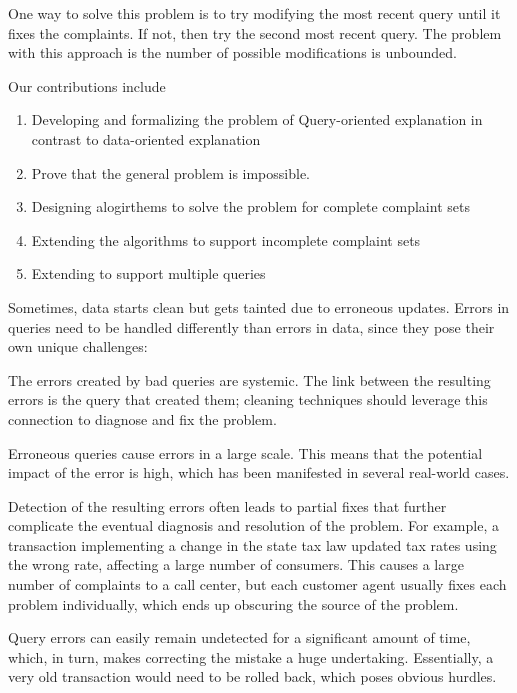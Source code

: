 One way to solve this problem is to try modifying the most recent query until it fixes the complaints.  
If not, then try the second most recent query.  
The problem with this approach is the number of possible modifications is unbounded.

Our contributions include

\begin{enumerate}
\item Developing and formalizing the problem of Query-oriented explanation in contrast to data-oriented explanation
\item Prove that the general problem is impossible.
\item Designing alogirthems to solve the problem for complete complaint sets
\item Extending the algorithms to support incomplete complaint sets
\item Extending to support multiple queries
\end{enumerate}


Sometimes, data starts clean but gets tainted due to erroneous
updates. Errors in queries need to be handled differently than errors
in data, since they pose their own unique challenges:

\begin{description}[leftmargin=5mm, topsep=0mm, itemsep=0mm]
    \item[Systemic errors.] The errors created by bad queries are
    systemic. The link between the resulting errors is the query
    that created them; cleaning techniques should leverage this
    connection to diagnose and fix the problem.
    
    \item[Large impact.] Erroneous queries cause errors in a large
    scale. This means that the potential impact of the error is high,
    which has been manifested in several real-world
    cases.%
    
    \item[Obscurity.] Detection of the resulting errors often leads to
    partial fixes that further complicate the eventual diagnosis and
    resolution of the problem. For example, a transaction implementing
    a change in the state tax law updated tax rates using the wrong
    rate, affecting a large number of consumers. This causes a large
    number of complaints to a call center, but each customer agent
    usually fixes each problem individually, which ends up obscuring
    the source of the problem.
    
    \item[Feasibility.] Query errors can easily remain undetected
    for a significant amount of time, which, in turn, makes correcting
    the mistake a huge undertaking. Essentially, a very old
    transaction would need to be rolled back, which poses obvious
    hurdles.
\end{description}

